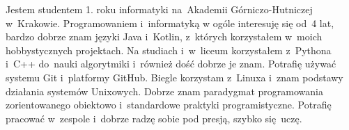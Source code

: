 \documentclass[9pt]{developercv} %
\begin{document}

\begin{minipage}[t]{0.5\textwidth} %
  \vspace{-\baselineskip} %
  Jestem studentem 1. roku informatyki na~Akademii Górniczo-Hutniczej w~Krakowie.
  Programowaniem i~informatyką w ogóle interesuję się od~4 lat, bardzo dobrze znam języki
  Java i~Kotlin, z~których korzystałem w~moich hobbystycznych projektach.
  Na studiach i~w~liceum korzystałem z~Pythona i~C++ do~nauki algorytmiki
  i~również dość dobrze je znam.
  Potrafię używać systemu Git i~platformy GitHub.
  Biegle korzystam z~Linuxa i~znam podstawy działania systemów Unixowych.
  Dobrze znam paradygmat programowania zorientowanego obiektowo i~standardowe praktyki programistyczne.
  Potrafię pracować w~zespole i~dobrze radzę sobie pod presją, szybko się~uczę.

\end{minipage}
\hfill %
\begin{minipage}[t]{0.45\textwidth} %
	\vspace{-\baselineskip} %
	\begin{barchart}{5.5}
	\end{barchart}
\end{minipage}



\end{document}
